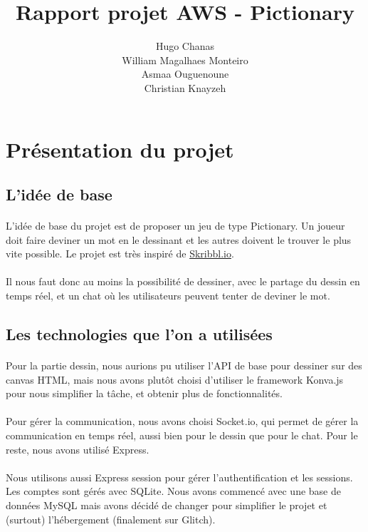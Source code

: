 \documentclass[11pt,a4paper]{article}
\date{}
\title{Rapport projet AWS - Pictionary}
\author{ Hugo Chanas \\ William Magalhaes Monteiro \\ Asmaa Ouguenoune \\ Christian Knayzeh }
\begin{document}
    \maketitle
    \section{Présentation du projet}
        \subsection{L'idée de base}
            \paragraph{}
            L'idée de base du projet est de proposer un jeu de type Pictionary.
            Un joueur doit faire deviner un mot en le dessinant et les autres doivent le trouver le plus vite possible.
            Le projet est très inspiré de \href{https://skribbl.io/}{Skribbl.io}.
            \paragraph{}
            Il nous faut donc au moins la possibilité de dessiner, avec le partage du dessin en temps réel,
            et un chat où les utilisateurs peuvent tenter de deviner le mot.
        \subsection{Les technologies que l'on a utilisées}
            \paragraph{}
            Pour la partie dessin, nous aurions pu utiliser l'API de base pour dessiner sur des canvas HTML,
            mais nous avons plutôt choisi d'utiliser le framework Konva.js pour nous simplifier la tâche, et obtenir plus de fonctionnalités.
            \paragraph{}
            Pour gérer la communication, nous avons choisi Socket.io, qui permet de gérer la communication en temps réel,
            aussi bien pour le dessin que pour le chat. Pour le reste, nous avons utilisé Express.
            \paragraph{}
            Nous utilisons aussi Express session pour gérer l'authentification et les sessions.
            Les comptes sont gérés avec SQLite.
            Nous avons commencé avec une base de données MySQL mais avons décidé de changer pour simplifier le projet et (surtout) l'hébergement (finalement sur Glitch).
\end{document}
